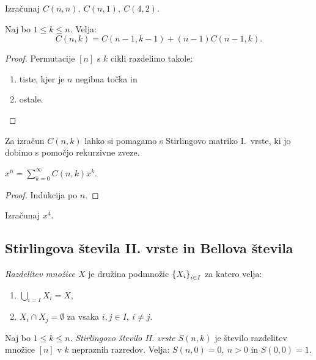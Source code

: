 \begin{primer}
    Izračunaj $C(n,n), \ C(n, 1), \ C(4,2)$.
\end{primer}

\begin{trditev}
    Naj bo $1 \leq k \leq n$. Velja:
    $$C(n, k) = C(n-1, k-1) + (n-1)C(n-1, k).$$
\end{trditev}

\begin{proof}
    Permutacije $[n]$ s $k$ cikli razdelimo takole:
    \begin{enumerate}
        \item tiste, kjer je $n$ negibna točka in
        \item ostale. \qedhere
    \end{enumerate}
\end{proof}

Za izračun $C(n,k)$ lahko si pomagamo s Stirlingovo matriko I.\ vrste, ki jo dobimo s pomočjo rekurzivne zveze.

\begin{trditev}
    $x^{\overline{n}} = \sum_{k=0}^{\infty}C(n,k)x^k$.
\end{trditev}

\begin{proof}
    Indukcija po $n$.
\end{proof}

\begin{primer}
    Izračunaj $x^{\overline{4}}$.
\end{primer}

\subsection{Stirlingova števila II. vrste in Bellova števila}
\begin{definicija}
    \emph{Razdelitev množice $X$} je družina podmnožic $\left\{X_i\right\}_{i \in I}$ za katero velja:
    \begin{enumerate}
        \item $\bigcup_{i=I}X_i =X$,
        \item $X_i \cap X_j = \emptyset$ za vsaka $i,j \in I, \ i \neq j$.
    \end{enumerate}
\end{definicija}

\begin{definicija}
    Naj bo $1 \leq k \leq n$. \emph{Stirlingovo število II. vrste $S(n,k)$} je število razdelitev množice $[n]$ v $k$ nepraznih razredov. Velja: $S(n, 0) = 0, \ n > 0$ in $S(0,0) = 1$.
\end{definicija}

